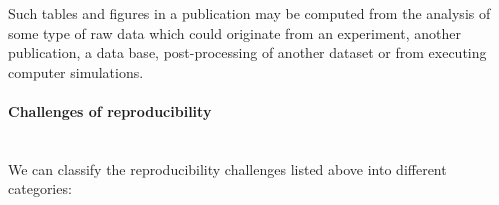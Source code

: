 Such tables and figures in a publication may be computed from the analysis of
some type of raw data which could originate from an experiment, another publication,
a data base, post-processing of another dataset or from executing computer
simulations.


\paragraph*{Challenges of reproducibility}\label{sec:reproducibility-challenges}

\mbox{}\\

We can classify the reproducibility challenges listed above into different categories:

